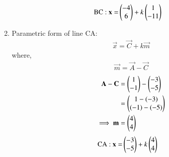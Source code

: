 \documentclass[journal,12pt,twocolumn]{IEEEtran}
\theoremstyle{remark}
\begin{document}
\begin{enumerate}
\begin{align}
\text{BC : } \mathbf{x} =& \begin{pmatrix}-4\\6\end{pmatrix} + k\begin{pmatrix}1\\-11\end{pmatrix}
\end{align}

\item Parametric form of line CA: 
\begin{align}
\vec{x} = \vec{C}+ k\vec{m}
\end{align}
where, \begin{align}
\vec{m} = \vec{A} - \vec{C}
\end{align}
\begin{align} 
\mathbf{ A } - \mathbf { C }&= \begin{pmatrix}1\\-1\end{pmatrix}- \begin{pmatrix}-3\\-5\end{pmatrix}\\
&= \begin{pmatrix}1-(-3)\\ (-1)-(-5)\end{pmatrix}\\
\implies \mathbf {m} &= \begin{pmatrix}4\\4\end{pmatrix}
\end{align}
\begin{align}
\text{CA : } \mathbf{x}=&\begin{pmatrix}-3\\-5\end{pmatrix}+ k\begin{pmatrix}4\\4\end{pmatrix}
\end{align}
\end{enumerate}
\end{document}
